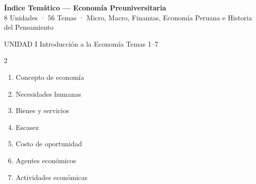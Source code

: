 
{
\hypersetup{linkcolor=AzulPizarra}
\tableofcontents
}
\newpage

\thispagestyle{fancy}

\begin{center}
  {\Large\sffamily\bfseries\color{AzulPizarra} Índice Temático — Economía Preuniversitaria}\\[4pt]
  {\small\sffamily\color{GrisMedio}
  8 Unidades · 56 Temas · Micro, Macro, Finanzas, Economía Peruana e Historia del Pensamiento}
\end{center}

\vspace{0.5cm}

\begin{tcolorbox}[enhanced, colback=AzulPizarra, colframe=DoradoAcadémico,
    arc=3pt, boxrule=1pt, left=8pt, right=8pt, top=5pt, bottom=5pt,
    fontupper=\sffamily\bfseries\color{white}]
  UNIDAD I \hfill Introducción a la Economía \hfill Temas 1–7
\end{tcolorbox}
\begin{multicols}{2}
  \begin{enumerate}[label=\textcolor{AzulPizarra}{\textbf{\arabic*.}},
      leftmargin=2em, itemsep=1pt]
    \item Concepto de economía
    \item Necesidades humanas
    \item Bienes y servicios
    \item Escasez
    \item Costo de oportunidad
    \item Agentes económicos
    \item Actividades económicas
  \end{enumerate}
\end{multicols}

\vspace{0.3cm}

